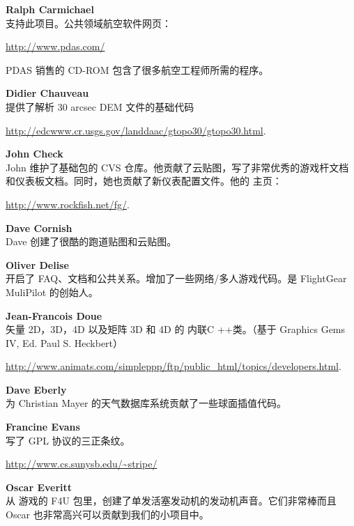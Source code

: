 \noindent \textbf{Ralph Carmichael}\\
支持此项目。公共领域航空软件网页：
\medskip

\href{http://www.pdas.com/}{http://www.pdas.com/}
 \medskip

 \noindent
 PDAS 销售的 CD-ROM 包含了很多航空工程师所需的程序。

\noindent \textbf{Didier Chauveau}\\
  提供了解析 30 arcsec DEM 文件的基础代码
   \medskip

  \href{http://edcwww.cr.usgs.gov/landdaac/gtopo30/gtopo30.html}{http://edcwww.cr.usgs.gov/landdaac/gtopo30/gtopo30.html}.
 \medskip

\noindent \textbf{John Check}\\
 John 维护了基础包的 CVS 仓库。他贡献了云贴图，写了非常优秀的游戏杆文档和仪表板文档。同时，她也贡献了新仪表配置文件。他的 \FlightGear{} 主页：
 \medskip

 \href{http://www.rockfish.net/fg/}{http://www.rockfish.net/fg/}.
 \medskip

\noindent \textbf{Dave Cornish}\\
 Dave 创建了很酷的跑道贴图和云贴图。
 \medskip

\noindent \textbf{Oliver Delise} \\
开启了 FAQ、文档和公共关系。增加了一些网络/多人游戏代码。是 FlightGear MuliPilot 的创始人。
\medskip

\noindent \textbf{Jean-Francois Doue}\\
矢量 2D，3D，4D 以及矩阵 3D 和 4D 的 内联C ++类。（基于 Graphics Gems IV, Ed. Paul S. Heckbert）
  \medskip

\href{http://www.animats.com/simpleppp/ftp/public_html/topics/developers.html}{http://www.animats.com/simpleppp/ftp/public\_html/topics/developers.html}.
 \medskip

\noindent \textbf{Dave Eberly} \\
为 Christian Mayer 的天气数据库系统贡献了一些球面插值代码。
  \medskip

\noindent \textbf{Francine Evans}\\
写了 GPL 协议的三正条纹。
  \medskip

\href{http://www.cs.sunysb.edu/~stripe/}{http://www.cs.sunysb.edu/\~{}stripe/}
\medskip

\noindent \textbf{Oscar Everitt}\\
从  游戏的 F4U 包里，创建了单发活塞发动机的发动机声音。它们非常棒而且 Oscar 也非常高兴可以贡献到我们的小项目中。
 \medskip

